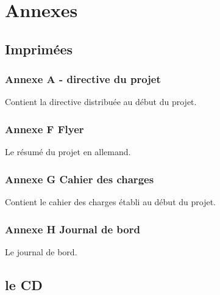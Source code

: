 \documentclass[12pt,a4paper,twoside]{report}
\begin{document}
\cleardoublepage
\chapter{Annexes}
\section{Imprimées}
\subsection{Annexe A - directive du projet}
Contient la directive distribuée au début du projet.
\subsection {Annexe F \- Flyer}
Le résumé du projet en allemand.
\subsection {Annexe G \- Cahier des charges}
Contient le cahier des charges établi au début du projet.
\subsection {Annexe H \- Journal de bord}
Le journal de bord.

\section{le CD}
\end{document}
